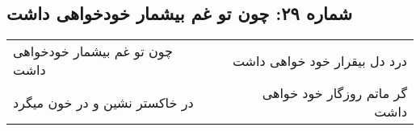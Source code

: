 \begin{center}
\section*{شماره ۲۹: چون تو غم بیشمار خودخواهی داشت}
\label{sec:029}
\begin{longtable}{l p{0.5cm} r}
چون تو غم بیشمار خودخواهی داشت
&&
درد دل بیقرار خود خواهی داشت
\\
در خاکستر نشین و در خون میگرد
&&
گر ماتم روزگار خود خواهی داشت
\\
\end{longtable}
\end{center}
